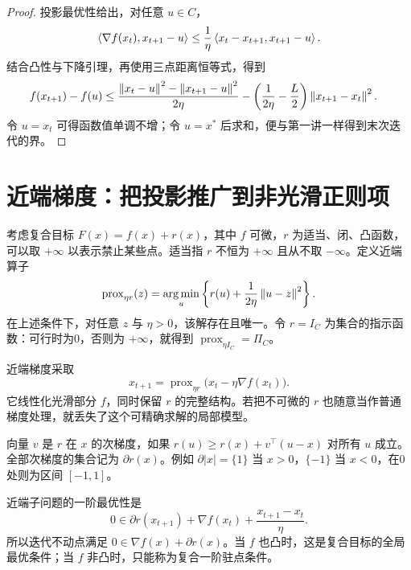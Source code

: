 \begin{proof}
投影最优性给出，对任意 $u\in C$，
\[
 \left\langle\nabla f(x_t),x_{t+1}-u\right\rangle
 \leq\frac1\eta\left\langle x_t-x_{t+1},x_{t+1}-u\right\rangle.
\]
结合凸性与下降引理，再使用三点距离恒等式，得到
\begin{align}
 f(x_{t+1})-f(u)
 &\leq\frac{\left\lVert x_t-u\right\rVert^2-\left\lVert x_{t+1}-u\right\rVert^2}{2\eta}
 -\left(\frac1{2\eta}-\frac L2\right)\left\lVert x_{t+1}-x_t\right\rVert^2.
 \label{l2:three-point}
\end{align}
令 $u=x_t$ 可得函数值单调不增；令 $u=x^*$ 后求和，便与第一讲一样得到末次迭代的界。
\end{proof}

\section{近端梯度：把投影推广到非光滑正则项}
\label{l2:proximal}

考虑复合目标 $F(x)=f(x)+r(x)$，其中 $f$ 可微，$r$ 为适当、闭、凸函数，可以取 $+\infty$ 以表示禁止某些点。适当指 $r$ 不恒为 $+\infty$ 且从不取 $-\infty$。定义近端算子
\begin{equation}
 \operatorname{prox}_{\eta r}(z)
 =\operatorname*{arg\,min}_u\left\{r(u)+\frac1{2\eta}\left\lVert u-z\right\rVert^2\right\}.
 \label{l2:prox-definition}
\end{equation}
在上述条件下，对任意 $z$ 与 $\eta>0$，该解存在且唯一。令 $r=I_C$ 为集合的指示函数：可行时为0，否则为 $+\infty$，就得到 $\operatorname{prox}_{\eta I_C}=\Pi_C$。

近端梯度采取
\begin{equation}
 x_{t+1}=\operatorname{prox}_{\eta r}
                    \bigl(x_t-\eta\nabla f(x_t)\bigr).
 \label{l2:proximal-gradient}
\end{equation}
它线性化光滑部分 $f$，同时保留 $r$ 的完整结构。若把不可微的 $r$ 也随意当作普通梯度处理，就丢失了这个可精确求解的局部模型。

\begin{definition}[凸函数的次梯度]
向量 $v$ 是 $r$ 在 $x$ 的次梯度，如果 $r(u)\geq r(x)+v^\top(u-x)$ 对所有 $u$ 成立。全部次梯度的集合记为 $\partial r(x)$。例如 $\partial|x|=\{1\}$ 当 $x>0$，$\{-1\}$ 当 $x<0$，在0处则为区间 $[-1,1]$。
\end{definition}

近端子问题的一阶最优性是
\begin{equation}
 0\in\partial r(x_{t+1})+\nabla f(x_t)
                         +\frac{x_{t+1}-x_t}{\eta}.
 \label{l2:prox-optimality}
\end{equation}
所以迭代不动点满足 $0\in\nabla f(x)+\partial r(x)$。当 $f$ 也凸时，这是复合目标的全局最优条件；当 $f$ 非凸时，只能称为复合一阶驻点条件。

